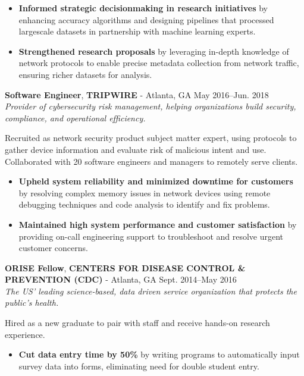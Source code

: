 \documentclass[a4paper,skipsamekey,11pt,english]{curve}
\newcommand{\makeWorkHistoryTitle}[5]{
  \begin{tcolorbox}[colback=base1!10,colframe=base1!10,frame hidden]
    {\color{blue}\textbf{#1}}, \textbf{#2} - #3 \hfill #4\\
    {\small\textit{#5}}
  \end{tcolorbox}
}
\begin{document}
  \begin{itemize}
    \item \textbf{Informed strategic decision\-making in research initiatives}
    by enhancing accuracy algorithms and designing pipelines that processed
    large\-scale datasets in partnership with machine learning experts.
    \item \textbf{Strengthened research proposals} by leveraging in-depth
    knowledge of network protocols to enable precise metadata collection from
    network traffic, ensuring richer datasets for analysis.
  \end{itemize}

  \makeWorkHistoryTitle
    {Software Engineer}
    {TRIPWIRE}
    {Atlanta, GA}
    {May 2016–Jun. 2018}
    {
      Provider of cybersecurity risk management, helping organizations build
      security, compliance, and operational efficiency.
    }

  Recruited as network security product subject matter expert, using
  protocols to gather device information and evaluate risk of malicious intent
  and use. Collaborated with 20 software engineers and managers to remotely
  serve clients.

  \begin{itemize}
    \item \textbf{Upheld system reliability and minimized downtime for customers}
    by resolving complex memory issues in network devices using remote debugging
    techniques and code analysis to identify and fix problems.
    \item \textbf{Maintained high system performance and customer satisfaction} by
    providing on-call engineering support to troubleshoot and resolve urgent
    customer concerns.
  \end{itemize}

  \makeWorkHistoryTitle
    {ORISE Fellow}
    {CENTERS FOR DISEASE CONTROL \& PREVENTION (CDC)}
    {Atlanta, GA}
    {Sept. 2014–May 2016}
    {
      The US' leading science-based, data driven service organization that
      protects the public's health.
    }
  Hired as a new graduate to pair with staff and receive hands-on
  research experience.

  \begin{itemize}
    \item \textbf{Cut data entry time by 50\%} by writing programs to
    automatically input survey data into forms, eliminating need for
    double student entry.
  \end{itemize}
\end{document}
